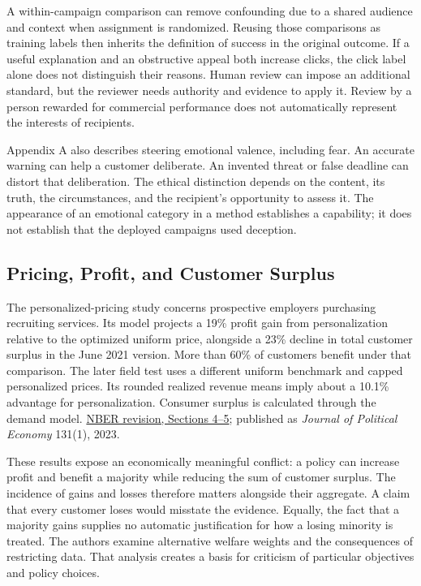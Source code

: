 A within-campaign comparison can remove confounding due to a shared
audience and context when assignment is randomized. Reusing those
comparisons as training labels then inherits the definition of success
in the original outcome. If a useful explanation and an obstructive
appeal both increase clicks, the click label alone does not distinguish
their reasons. Human review can impose an additional standard, but the
reviewer needs authority and evidence to apply it. Review by a person
rewarded for commercial performance does not automatically represent the
interests of recipients.

Appendix A also describes steering emotional valence, including fear. An
accurate warning can help a customer deliberate. An invented threat or
false deadline can distort that deliberation. The ethical distinction
depends on the content, its truth, the circumstances, and the
recipient's opportunity to assess it. The appearance of an emotional
category in a method establishes a capability; it does not establish
that the deployed campaigns used deception.

\hypertarget{M09-pricing-profit-and-customer-surplus}{%
\subsection{Pricing, Profit, and Customer
Surplus}\label{M09-pricing-profit-and-customer-surplus}}

\noindent The personalized-pricing study concerns prospective employers purchasing
recruiting services. Its model projects a 19\% profit gain from
personalization relative to the optimized uniform price, alongside a
23\% decline in total customer surplus in the June 2021 version. More
than 60\% of customers benefit under that comparison. The later field
test uses a different uniform benchmark and capped personalized prices.
Its rounded realized revenue means imply about a 10.1\% advantage for
personalization. Consumer surplus is calculated through the demand
model.
\href{https://www.nber.org/system/files/working_papers/w23775/w23775.pdf}{NBER
revision, Sections 4--5}; published as \emph{Journal of Political
Economy} 131(1), 2023.

These results expose an economically meaningful conflict: a policy can
increase profit and benefit a majority while reducing the sum of
customer surplus. The incidence of gains and losses therefore matters
alongside their aggregate. A claim that every customer loses would
misstate the evidence. Equally, the fact that a majority gains supplies
no automatic justification for how a losing minority is treated. The
authors examine alternative welfare weights and the consequences of
restricting data. That analysis creates a basis for criticism of
particular objectives and policy choices.

